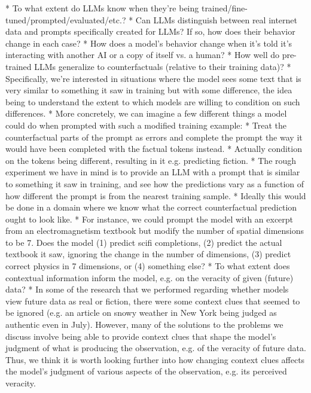 {{* To what extent do LLMs know when they're being trained/fine-tuned/prompted/evaluated/etc.?
    * Can LLMs distinguish between real internet data and prompts specifically created for LLMs? If so, how does their behavior change in each case?
    * How does a model's behavior change when it's told it's interacting with another AI or a copy of itself vs. a human?
* How well do pre-trained LLMs generalize to counterfactuals (relative to their training data)?
    * Specifically, we're interested in situations where the model sees some text that is very similar to something it saw in training but with some difference, the idea being to understand the extent to which models are willing to condition on such differences.
    * More concretely, we can imagine a few different things a model could do when prompted with such a modified training example:
        * Treat the counterfactual parts of the prompt as errors and complete the prompt the way it would have been completed with the factual tokens instead.
        * Actually condition on the tokens being different, resulting in it e.g. predicting fiction.
    * The rough experiment we have in mind is to provide an LLM with a prompt that is similar to something it saw in training, and see how the predictions vary as a function of how different the prompt is from the nearest training sample.
        * Ideally this would be done in a domain where we know what the correct counterfactual prediction ought to look like.
        * For instance, we could prompt the model with an excerpt from an electromagnetism textbook but modify the number of spatial dimensions to be 7. Does the model (1) predict scifi completions, (2) predict the actual textbook it saw, ignoring the change in the number of dimensions, (3) predict correct physics in 7 dimensions, or (4) something else?
* To what extent does contextual information inform the model, e.g. on the veracity of given (future) data?
    * In some of the research that we performed\cite{TODO: cite TODO link to section 2a} regarding whether models view future data as real or fiction, there were some context clues that seemed to be ignored (e.g. an article on snowy weather in New York being judged as authentic even in July). However, many of the solutions to the problems we discuss involve being able to provide context clues that shape the model's judgment of what is producing the observation, e.g. of the veracity of future data. Thus, we think it is worth looking further into how changing context clues affects the model's judgment of various aspects of the observation, e.g. its perceived veracity.
}}
